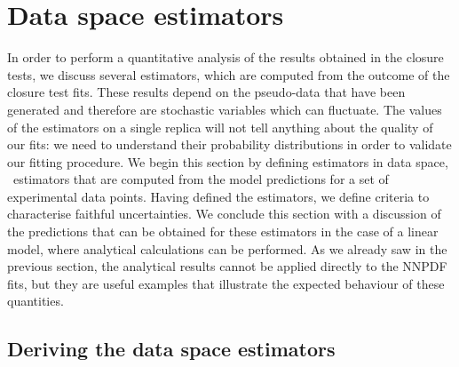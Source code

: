 \section{Data space estimators} 
\label{sec:ClosureEstimators}

In order to perform a quantitative analysis of the results obtained in the
closure tests, we discuss several estimators, which are computed from the
outcome of the closure test fits. These results depend on the pseudo-data that
have been generated and therefore are stochastic variables which can fluctuate.
The values of the estimators on a single replica will not tell anything about
the quality of our fits: we need to understand their probability distributions
in order to validate our fitting procedure. We begin this section by defining
estimators in data space, \ie\ estimators that are computed from the model
predictions for a set of experimental data points. Having defined the
estimators, we define criteria to characterise faithful uncertainties. We
conclude this section with a discussion of the predictions that can be obtained
for these estimators in the case of a linear model, where analytical
calculations can be performed. As we already saw in the previous section, the
analytical results cannot be applied directly to the NNPDF fits, but they are
useful examples that illustrate the expected behaviour of these quantities.

\subsection{Deriving the data space estimators}
\label{sec:ClosureEstimatorsDerivation}

